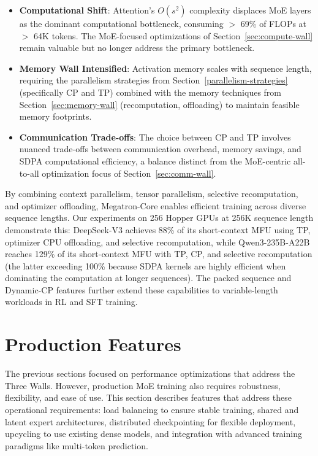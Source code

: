 \documentclass[10pt,logo,copyright]{nvidiatechreport}
\begin{document}
\begin{itemize}
    \item \textbf{Computational Shift}: Attention's $O(s^2)$ complexity displaces MoE layers as the dominant computational bottleneck, consuming $>$ 69\% of FLOPs at $>$ 64K tokens. The MoE-focused optimizations of Section~\ref{sec:compute-wall} remain valuable but no longer address the primary bottleneck.
    
    \item \textbf{Memory Wall Intensified}: Activation memory scales with sequence length, requiring the parallelism strategies from Section~\ref{parallelism-strategies} (specifically CP and TP) combined with the memory techniques from Section~\ref{sec:memory-wall} (recomputation, offloading) to maintain feasible memory footprints.
    
    \item \textbf{Communication Trade-offs}: The choice between CP and TP involves nuanced trade-offs between communication overhead, memory savings, and SDPA computational efficiency, a balance distinct from the MoE-centric all-to-all optimization focus of Section~\ref{sec:comm-wall}.
\end{itemize}

By combining context parallelism, tensor parallelism, selective recomputation, and optimizer offloading, Megatron-Core enables efficient training across diverse sequence lengths. Our experiments on 256 Hopper GPUs at 256K sequence length demonstrate this: DeepSeek-V3 achieves 88\% of its short-context MFU using TP, optimizer CPU offloading, and selective recomputation, while Qwen3-235B-A22B reaches 129\% of its short-context MFU with TP, CP, and selective recomputation (the latter exceeding 100\% because SDPA kernels are highly efficient when dominating the computation at longer sequences). The packed sequence and Dynamic-CP features further extend these capabilities to variable-length workloads in RL and SFT training.



\section{Production Features}\label{sec:production-features}

The previous sections focused on performance optimizations that address the Three Walls. However, production MoE training also requires robustness, flexibility, and ease of use. This section describes features that address these operational requirements: load balancing to ensure stable training, shared and latent expert architectures, distributed checkpointing for flexible deployment, upcycling to use existing dense models, and integration with advanced training paradigms like multi-token prediction.
\end{document}
